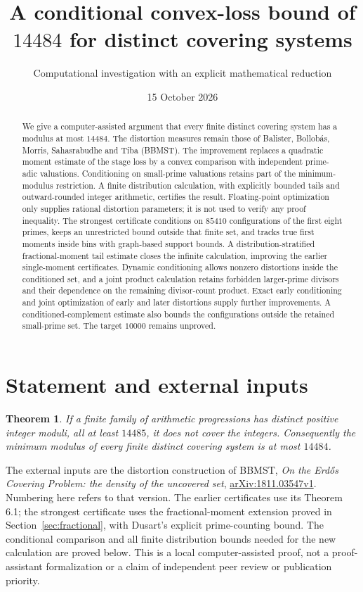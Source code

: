 \documentclass[11pt]{article}
\title{A conditional convex-loss bound of $14484$ for distinct covering systems}
\author{Computational investigation with an explicit mathematical reduction}
\date{15 October 2026}
\newtheorem{theorem}{Theorem}
\begin{document}
\maketitle
\begin{abstract}
We give a computer-assisted argument that every finite distinct covering
system has a modulus at most $14484$. The distortion measures remain those
of Balister, Bollob\'as, Morris, Sahasrabudhe and Tiba (BBMST).
The improvement replaces a quadratic moment estimate of the
stage loss by a convex comparison with independent prime-adic valuations.
Conditioning on small-prime valuations retains part of the
minimum-modulus restriction. A finite distribution calculation, with explicitly
bounded tails and outward-rounded integer arithmetic, certifies the result.
Floating-point optimization only supplies rational distortion parameters;
it is not used to verify any proof inequality.
The strongest certificate conditions on $85410$ configurations of the first
eight primes, keeps an unrestricted bound outside that finite set, and
tracks true first moments inside bins with graph-based support bounds.
A distribution-stratified fractional-moment tail estimate closes the
infinite calculation, improving the earlier single-moment certificates.
Dynamic conditioning allows nonzero distortions inside the conditioned set,
and a joint product calculation retains forbidden larger-prime divisors
and their dependence on the remaining divisor-count product.
Exact early conditioning and joint optimization of early and later
distortions supply further improvements. A conditioned-complement estimate
also bounds the configurations outside the retained small-prime set.
The target $10000$
remains unproved.
\end{abstract}

\section{Statement and external inputs}
\begin{theorem}\label{thm:main}
If a finite family of arithmetic progressions has distinct positive integer
moduli, all at least $14485$, it does not cover the integers. Consequently
the minimum modulus of every finite distinct covering system is at most
$14484$.
\end{theorem}

The external inputs are the distortion construction of BBMST,
\emph{On the Erd\H{o}s Covering Problem: the density of the uncovered set},
\href{https://arxiv.org/html/1811.03547v1}{arXiv:1811.03547v1}. Numbering here
refers to that version. The earlier certificates use its Theorem 6.1;
the strongest certificate uses the fractional-moment extension proved in
Section~\ref{sec:fractional}, with Dusart's explicit prime-counting bound.
The conditional comparison and all finite distribution
bounds needed for the new calculation are proved below. This is a local
computer-assisted proof, not a proof-assistant formalization or a claim of
independent peer review or publication priority.
\end{document}
